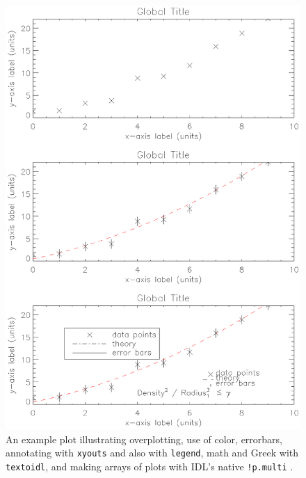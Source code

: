 \documentclass[psfig,preprint]{aastex}
\begin{document}
\begin{figure} [!ht]
\begin{center}
\includegraphics[scale=0.6]{bpfig1.ps}
\caption{An example plot illustrating overplotting, use of color,
  errorbars, annotating with {\tt xyouts} and also with {\tt legend},
  math and Greek with {\tt textoidl}, and making arrays of plots with
  IDL's native {\tt !p.multi} .\label{fig1}}
\end{center}
\end{figure}
\end{document}
